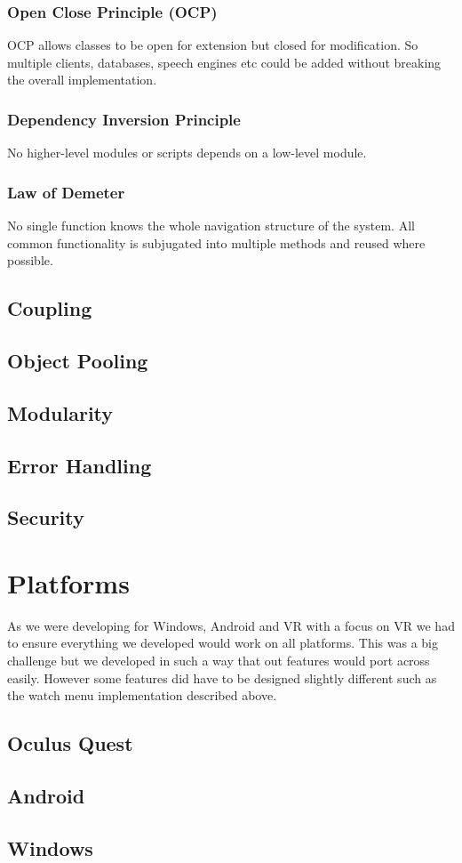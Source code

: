 \subsubsection{Open Close Principle (OCP)}
OCP allows classes to be open for extension but closed for modification. So multiple clients, databases, speech engines etc could be added without breaking the overall implementation.

\subsubsection{Dependency Inversion Principle}
No higher-level modules or scripts depends on a low-level module. 

\subsubsection{Law of Demeter}
No single function knows the whole navigation structure of the system. All common functionality is subjugated into multiple methods and reused where possible.

\subsection{Coupling}

\subsection{Object Pooling}

\subsection{Modularity}

\subsection{Error Handling}

\subsection{Security}

\section{Platforms}
As we were developing for Windows, Android and VR with a focus on VR we had to ensure everything we developed would work on all platforms. This was a big challenge but we developed in such a way that out features would port across easily. However some features did have to be designed slightly different such as the watch menu implementation described above.

\subsection{Oculus Quest}
\subsection{Android}
\subsection{Windows}
